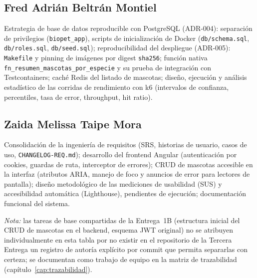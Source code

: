 \subsection*{Fred Adri\'an Beltr\'an Montiel}
Estrategia de base de datos reproducible con PostgreSQL (ADR-004):
separaci\'on de privilegios (\texttt{biopet_app}), scripts de
inicializaci\'on de Docker (\texttt{db/schema.sql}, \texttt{db/roles.sql},
\texttt{db/seed.sql}); reproducibilidad del despliegue (ADR-005):
\texttt{Makefile} y pinning de im\'agenes por digest \texttt{sha256};
funci\'on nativa \texttt{fn_resumen_mascotas_por_especie} y su prueba de
integraci\'on con Testcontainers; cach\'e Redis del listado de mascotas;
dise\~no, ejecuci\'on y an\'alisis estad\'istico de las corridas de
rendimiento con k6 (intervalos de confianza, percentiles, tasa de error,
throughput, hit ratio).

\subsection*{Zaida Melissa Taipe Mora}
Consolidaci\'on de la ingenier\'ia de requisitos (SRS, historias de
usuario, casos de uso, \texttt{CHANGELOG-REQ.md}); desarrollo del frontend
Angular (autenticaci\'on por cookies, guardas de ruta, interceptor de
errores); CRUD de mascotas accesible en la interfaz (atributos ARIA,
manejo de foco y anuncios de error para lectores de pantalla); dise\~no
metodol\'ogico de las mediciones de usabilidad (SUS) y accesibilidad
autom\'atica (Lighthouse), pendientes de ejecuci\'on; documentaci\'on
funcional del sistema.

\bigskip
\noindent\textit{Nota:} las tareas de base compartidas de la Entrega~1B
(estructura inicial del CRUD de mascotas en el backend, esquema JWT
original) no se atribuyen individualmente en esta tabla por no existir en
el repositorio de la Tercera Entrega un registro de autor\'ia expl\'icito
por commit que permita separarlas con certeza; se documentan como trabajo
de equipo en la matriz de trazabilidad (cap\'itulo~\ref{cap:trazabilidad}).
